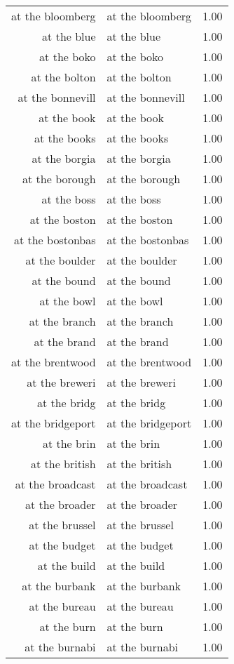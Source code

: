 \begin{table}[ht]
\begin{tabular}{rlr}
  at the bloomberg & at the bloomberg & 1.00 \\ 
  at the blue & at the blue & 1.00 \\ 
  at the boko & at the boko & 1.00 \\ 
  at the bolton & at the bolton & 1.00 \\ 
  at the bonnevill & at the bonnevill & 1.00 \\ 
  at the book & at the book & 1.00 \\ 
  at the books & at the books & 1.00 \\ 
  at the borgia & at the borgia & 1.00 \\ 
  at the borough & at the borough & 1.00 \\ 
  at the boss & at the boss & 1.00 \\ 
  at the boston & at the boston & 1.00 \\ 
  at the bostonbas & at the bostonbas & 1.00 \\ 
  at the boulder & at the boulder & 1.00 \\ 
  at the bound & at the bound & 1.00 \\ 
  at the bowl & at the bowl & 1.00 \\ 
  at the branch & at the branch & 1.00 \\ 
  at the brand & at the brand & 1.00 \\ 
  at the brentwood & at the brentwood & 1.00 \\ 
  at the breweri & at the breweri & 1.00 \\ 
  at the bridg & at the bridg & 1.00 \\ 
  at the bridgeport & at the bridgeport & 1.00 \\ 
  at the brin & at the brin & 1.00 \\ 
  at the british & at the british & 1.00 \\ 
  at the broadcast & at the broadcast & 1.00 \\ 
  at the broader & at the broader & 1.00 \\ 
  at the brussel & at the brussel & 1.00 \\ 
  at the budget & at the budget & 1.00 \\ 
  at the build & at the build & 1.00 \\ 
  at the burbank & at the burbank & 1.00 \\ 
  at the bureau & at the bureau & 1.00 \\ 
  at the burn & at the burn & 1.00 \\ 
  at the burnabi & at the burnabi & 1.00 \\ 

\end{tabular}
\end{table}
